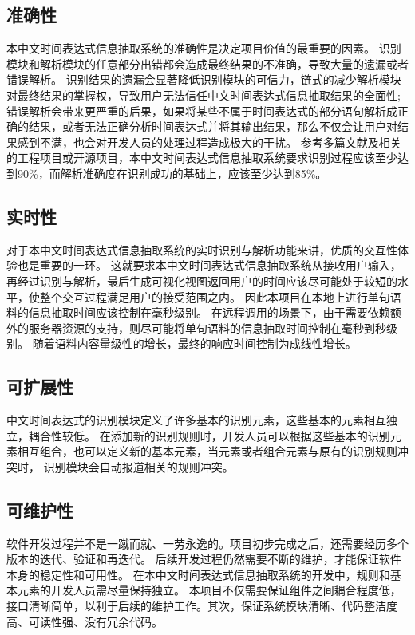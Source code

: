 \subsection{准确性}

本中文时间表达式信息抽取系统的准确性是决定项目价值的最重要的因素。
识别模块和解析模块的任意部分出错都会造成最终结果的不准确，导致大量的遗漏或者错误解析。
识别结果的遗漏会显著降低识别模块的可信力，链式的减少解析模块对最终结果的掌握权，导致用户无法信任中文时间表达式信息抽取结果的全面性;
错误解析会带来更严重的后果，如果将某些不属于时间表达式的部分语句解析成正确的结果，或者无法正确分析时间表达式并将其输出结果，那么不仅会让用户对结果感到不满，也会对开发人员的处理过程造成极大的干扰。
参考多篇文献及相关的工程项目或开源项目，本中文时间表达式信息抽取系统要求识别过程应该至少达到90\%，而解析准确度在识别成功的基础上，应该至少达到85\%。

\subsection{实时性}

对于本中文时间表达式信息抽取系统的实时识别与解析功能来讲，优质的交互性体验也是重要的一环。
这就要求本中文时间表达式信息抽取系统从接收用户输入，再经过识别与解析，最后生成可视化视图返回用户的时间应该尽可能处于较短的水平，使整个交互过程满足用户的接受范围之内。
因此本项目在本地上进行单句语料的信息抽取时间应该控制在毫秒级别。
在远程调用的场景下，由于需要依赖额外的服务器资源的支持，则尽可能将单句语料的信息抽取时间控制在毫秒到秒级别。
随着语料内容量级性的增长，最终的响应时间控制为成线性增长。

\subsection{可扩展性}

中文时间表达式的识别模块定义了许多基本的识别元素，这些基本的元素相互独立，耦合性较低。
在添加新的识别规则时，开发人员可以根据这些基本的识别元素相互组合，也可以定义新的基本元素，当元素或者组合元素与原有的识别规则冲突时，
识别模块会自动报道相关的规则冲突。

\subsection{可维护性}

软件开发过程并不是一蹴而就、一劳永逸的。项目初步完成之后，还需要经历多个版本的迭代、验证和再迭代。
后续开发过程仍然需要不断的维护，才能保证软件本身的稳定性和可用性。
在本中文时间表达式信息抽取系统的开发中，规则和基本元素的开发人员需尽量保持独立。
本项目不仅需要保证组件之间耦合程度低，接口清晰简单，以利于后续的维护工作。其次，保证系统模块清晰、代码整洁度高、可读性强、没有冗余代码。

